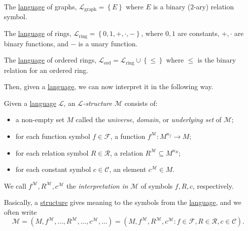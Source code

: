 \begin{eg}[Graph]\label{eg:language-graph}
	The \hyperref[def:language]{language} of graphs, \(\mathcal{L} _{\text{graph} } = \left\{ E \right\}\) where \(E\) is a binary (\(2\)-ary) relation symbol.
\end{eg}

\begin{eg}[Ring]\label{eg:language-ring}
	The \hyperref[def:language]{language} of rings, \(\mathcal{L} _{\text{ring} } = \left\{ 0, 1, +, \cdot, - \right\} \), where \(0, 1\) are constants, \(+, \cdot\) are binary functions, and \(-\) is a unary function.
\end{eg}

\begin{eg}\label{eg:language-ordered-ring}
	The \hyperref[def:language]{language} of ordered rings, \(\mathcal{L} _{\text{ord} } = \mathcal{L} _{\text{ring} } \cup \left\{ \leq \right\} \) where \(\leq \) is the binary relation for an ordered ring.
\end{eg}

Then, given a \hyperref[def:language]{language}, we can now interpret it in the following way.

\begin{definition}[Structure]\label{def:structure}
	Given a \hyperref[def:language]{language} \(\mathcal{L} \), an \emph{\(\mathcal{L} \)-structure} \(\mathcal{M} \) consists of:
	\begin{itemize}
		\item a non-empty set \(M\) called the \emph{universe}, \emph{domain}, or \emph{underlying set} of \(\mathcal{M} \);
		\item for each function symbol \(f\in \mathcal{F} \), a function \(f^{\mathcal{M} } \colon M^{n_f} \to M\);
		\item for each relation symbol \(R\in \mathcal{R} \), a relation \(R^{\mathcal{M} } \subseteq M^{n_R}\);
		\item for each constant symbol \(c\in \mathcal{C} \), an element \(c^{\mathcal{M} }\in M\).
	\end{itemize}
\end{definition}

\begin{note}[Interpretation]
	We call \(f^{\mathcal{M} }, R^{\mathcal{M} }, c^{\mathcal{M} }\) the \emph{interpretation in \(\mathcal{M} \)} of symbols \(f, R, c\), respectively.
\end{note}

Basically, a \hyperref[def:structure]{structure} gives meaning to the symbols from the \hyperref[def:language]{language}, and we often write
\[
	\mathcal{M}
	= (M, f^{\mathcal{M} }, \ldots , R^{\mathcal{M} }, \ldots , c^{\mathcal{M} }, \ldots)
	= (M, f^{\mathcal{M} }, R^{\mathcal{M} }, c^{\mathcal{M} } \colon f\in \mathcal{F} , R\in \mathcal{R} , c\in \mathcal{C} ).
\]

